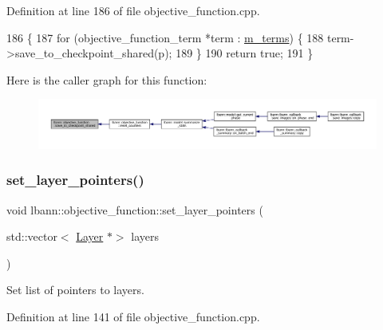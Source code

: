 Definition at line 186 of file objective\+\_\+function.\+cpp.


\begin{DoxyCode}
186                                                                   \{
187   \textcolor{keywordflow}{for} (objective\_function\_term *term : \hyperlink{classlbann_1_1objective__function_aea9c1f90ba9af1b1330efa2ba6adb5e2}{m\_terms}) \{
188     term->save\_to\_checkpoint\_shared(p);
189   \}
190   \textcolor{keywordflow}{return} \textcolor{keyword}{true};
191 \}
\end{DoxyCode}
Here is the caller graph for this function\+:\nopagebreak
\begin{figure}[H]
\begin{center}
\leavevmode
\includegraphics[width=350pt]{classlbann_1_1objective__function_a5c7de99300ce17535648bfcbc3b97aeb_icgraph}
\end{center}
\end{figure}
\mbox{\label{classlbann_1_1objective__function_a0f934e078b55528dd0ec1ec8ad34c73b}} 
\subsubsection{\texorpdfstring{set\+\_\+layer\+\_\+pointers()}{set\_layer\_pointers()}}
{\footnotesize\ttfamily void lbann\+::objective\+\_\+function\+::set\+\_\+layer\+\_\+pointers (\begin{DoxyParamCaption}\item[{std\+::vector$<$ \hyperlink{classlbann_1_1Layer}{Layer} $\ast$$>$}]{layers }\end{DoxyParamCaption})}

Set list of pointers to layers. 

Definition at line 141 of file objective\+\_\+function.\+cpp.


